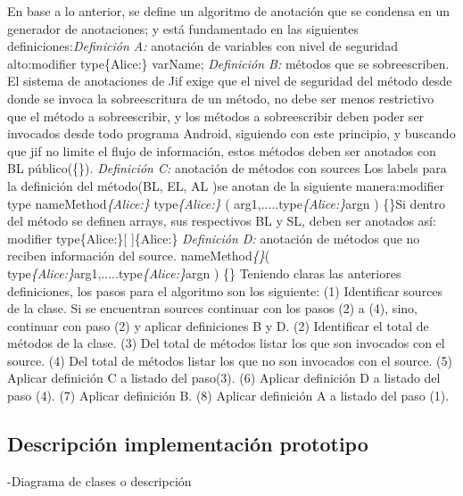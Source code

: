 En base a lo anterior, se define un algoritmo de anotación que se condensa en un
generador de anotaciones; y está fundamentado en las siguientes
definiciones:\newline \textit{Definición A:} anotación de variables con nivel de
seguridad alto:\newline modifier type\{Alice:\} varName;\newline 
\textit{Definición B:} métodos que se sobreescriben. El sistema de anotaciones
de Jif exige que el nivel de seguridad del método desde donde se invoca la
sobreescritura de un método, no debe ser menos restrictivo que el método a
sobreescribir, y los métodos a sobreescribir deben poder ser invocados desde
todo programa Android, siguiendo con este principio, y buscando que jif no
limite el flujo de información, estos métodos deben ser anotados con BL
público(\{\}).\newline 
\textit{Definición C:} anotación de métodos con sources\newline
Los labels para la definición del método(BL, EL, AL )se anotan de la
siguiente manera:\newline modifier type
nameMethod\textit{\{Alice:\}} type\textit{\{Alice:\}}
( arg1,.....type\textit{\{Alice:\}}argn ) \{\}\newline Si dentro del método se
definen arrays, sus respectivos BL y SL, deben ser anotados así: modifier type\{Alice:\}[ ]\{Alice:\}\newline
\textit{Definición D:} anotación de métodos que no reciben información del
source. 
nameMethod\textit{\{\}}(
type\textit{\{Alice:\}}arg1,.....type\textit{\{Alice:\}}argn ) \{\}\newline
Teniendo claras las anteriores definiciones, los pasos para el algoritmo son los
siguiente:\newline
(1) Identificar sources de la clase. Si se encuentran sources continuar con
los pasos (2) a (4), sino, continuar con paso (2) y aplicar definiciones B y
D.\newline
(2) Identificar el total de métodos de la clase.\newline
(3) Del total de métodos listar los que son invocados con el source.\newline
(4) Del total de métodos listar los que no son invocados con el source.\newline
(5) Aplicar definición C a listado del paso(3).\newline
(6) Aplicar definición D a listado del paso (4).\newline
(7) Aplicar definición B. \newline
(8) Aplicar definición A a listado del paso (1).

\subsection{Descripción implementación prototipo}
-Diagrama de clases o descripción
